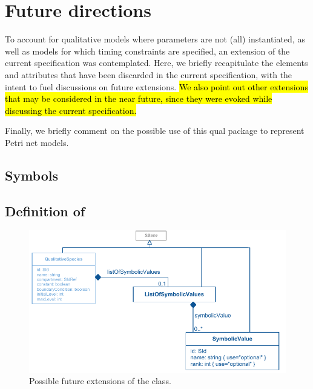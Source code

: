 
\section{Future directions}
\label{apdx-future}

To account for qualitative models where parameters are not (all) instantiated, as well as models for which timing constraints are specified, an extension of the current specification was contemplated. Here, we briefly recapitulate the elements and attributes that have been discarded in the current specification, with the intent to fuel discussions on future extensions. \hl{We also point out other extensions that may be considered in the near future, since they were evoked while discussing the current specification.}

Finally, we briefly comment on the possible use of this qual package to represent Petri net  models. 



\subsection{Symbols}

\subsection*{Definition of } %

\begin{figure}[hb]
  \includegraphics{figs/qual-qualitative-species-future-uml.pdf}
  \caption{Possible future extensions of the \QualitativeSpecies class.}
  \label{qual_future_directions}
\end{figure}

